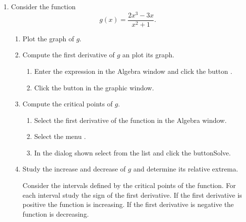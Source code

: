 \begin{enumerate}[leftmargin=*]
\item Consider the function
\[
g(x)=\dfrac{2x^{3}-3x}{x^{2}+1}.
\]

\begin{enumerate}
\item  Plot the graph of $g$.

\item Compute the first derivative of $g$ an plot its graph.
\begin{indication}
\begin{enumerate}
\item Enter the expression  in the Algebra window and click the button .
\item Click the button  in the graphic window.
\end{enumerate}
\end{indication}

\item Compute the critical points of $g$.
\begin{indication}
\begin{enumerate}
\item Select the first derivative of the function in the Algebra window.
\item Select the menu .
\item In the dialog shown select  from the  list and click the button{Solve}.
\end{enumerate}
\end{indication}

\item Study the increase and decrease of $g$ and determine its relative extrema.
\begin{indication}
Consider the intervals defined by the critical points of the function. 
For each interval study the sign of the first derivative. 
If the first derivative is positive the function is increasing. 
If the first derivative is negative the function is decreasing.


\end{indication}
\end{enumerate}
\end{enumerate}
